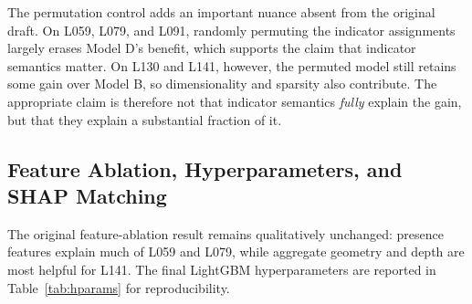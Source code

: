 \documentclass[10pt,twocolumn]{article}
\newcommand{\tabref}[1]{Table~\ref{#1}}
\begin{document}
\begin{table}[t]
\centering
\footnotesize
\caption{Paired Model B vs.\ Model D comparison on the test set. The
permutation control preserves indicator dimensionality but shuffles indicator
assignments within split, breaking image-indicator semantics.}
\label{tab:indicator}
\end{table}

The permutation control adds an important nuance absent from the original draft.
On L059, L079, and L091, randomly permuting the indicator assignments largely
erases Model D's benefit, which supports the claim that indicator semantics
matter. On L130 and L141, however, the permuted model still retains some gain
over Model B, so dimensionality and sparsity also contribute. The appropriate
claim is therefore not that indicator semantics \emph{fully} explain the
gain, but that they explain a substantial fraction of it.

\subsection{Feature Ablation, Hyperparameters, and SHAP Matching}

The original feature-ablation result remains qualitatively unchanged: presence
features explain much of L059 and L079, while aggregate geometry and depth are
most helpful for L141. The final LightGBM hyperparameters are reported in
\tabref{tab:hparams} for reproducibility.
\end{document}
